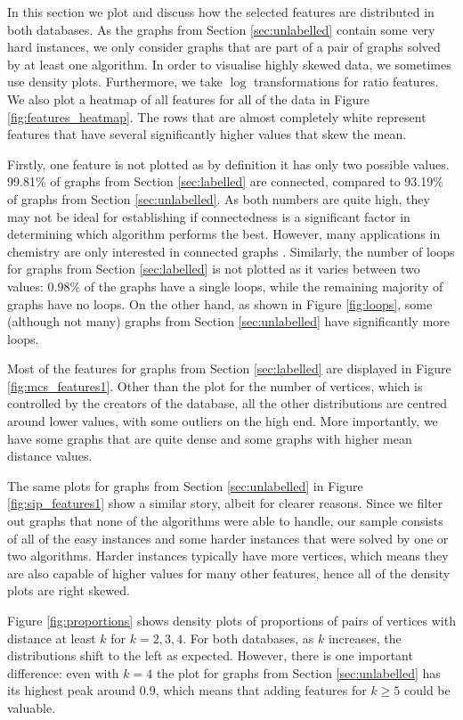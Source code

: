\documentclass{l4proj}
\theoremstyle{definition}
\theoremstyle{remark}
\begin{document}
In this section we plot and discuss how the selected features are distributed in
both databases. As the graphs from Section \ref{sec:unlabelled} contain some
very hard instances, we only consider graphs that are part of a pair of graphs
solved by at least one algorithm. In order to visualise highly skewed data, we
sometimes use density plots. Furthermore, we take $\log$ transformations for
ratio features. We also plot a heatmap of all features for all of the data in
Figure \ref{fig:features_heatmap}. The rows that are almost completely white
represent features that have several significantly higher values that skew the
mean.

Firstly, one feature is not plotted as by definition it has only two possible
values. 99.81\% of graphs from Section \ref{sec:labelled} are connected,
compared to 93.19\% of graphs from Section \ref{sec:unlabelled}. As both numbers
are quite high, they may not be ideal for establishing if connectedness is a
significant factor in determining which algorithm performs the best. However,
many applications in chemistry are only interested in connected graphs
\cite{WCMS:WCMS5}. Similarly, the number of loops for graphs from Section
\ref{sec:labelled} is not plotted as it varies between two values: 0.98\% of the
graphs have a single loops, while the remaining majority of graphs have no
loops. On the other hand, as shown in Figure \ref{fig:loops}, some (although not
many) graphs from Section \ref{sec:unlabelled} have significantly more loops.

Most of the features for graphs from Section \ref{sec:labelled} are displayed in
Figure \ref{fig:mcs_features1}. Other than the plot for the number of vertices,
which is controlled by the creators of the database, all the other distributions
are centred around lower values, with some outliers on the high end. More
importantly, we have some graphs that are quite dense and some graphs with
higher mean distance values.

The same plots for graphs from Section \ref{sec:unlabelled} in Figure
\ref{fig:sip_features1} show a similar story, albeit for clearer reasons. Since
we filter out graphs that none of the algorithms were able to handle, our sample
consists of all of the easy instances and some harder instances that were
solved by one or two algorithms. Harder instances typically have more vertices,
which means they are also capable of higher values for many other features,
hence all of the density plots are right skewed.

Figure \ref{fig:proportions} shows density plots of proportions of pairs of
vertices with distance at least $k$ for $k = 2, 3, 4$. For both databases, as
$k$ increases, the distributions shift to the left as expected. However, there
is one important difference: even with $k = 4$ the plot for graphs from Section
\ref{sec:unlabelled} has its highest peak around 0.9, which means that adding
features for $k \ge 5$ could be valuable.
\end{document}
